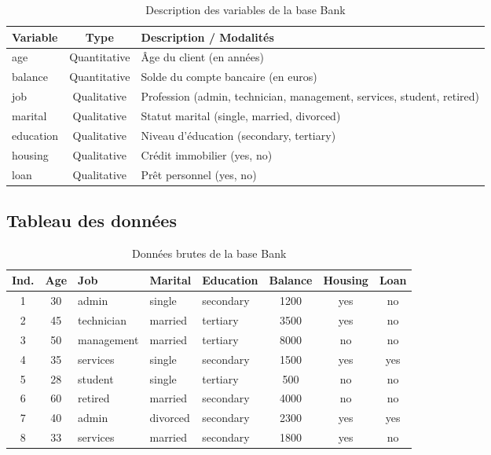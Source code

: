\documentclass[12pt,a4paper]{article}
\begin{document}
\begin{table}[H]
\centering
\caption{Description des variables de la base Bank}
\begin{tabular}{|l|c|l|}
\hline
\textbf{Variable} & \textbf{Type} & \textbf{Description / Modalités} \\
\hline
age & Quantitative & Âge du client (en années) \\
balance & Quantitative & Solde du compte bancaire (en euros) \\
job & Qualitative & Profession (admin, technician, management, services, student, retired) \\
marital & Qualitative & Statut marital (single, married, divorced) \\
education & Qualitative & Niveau d'éducation (secondary, tertiary) \\
housing & Qualitative & Crédit immobilier (yes, no) \\
loan & Qualitative & Prêt personnel (yes, no) \\
\hline
\end{tabular}
\end{table}

\subsection{Tableau des données}

\begin{table}[H]
\centering
\caption{Données brutes de la base Bank}
\footnotesize
\begin{tabular}{|c|c|l|l|l|c|c|c|}
\hline
\textbf{Ind.} & \textbf{Age} & \textbf{Job} & \textbf{Marital} & \textbf{Education} & \textbf{Balance} & \textbf{Housing} & \textbf{Loan} \\
\hline
1 & 30 & admin & single & secondary & 1200 & yes & no \\
2 & 45 & technician & married & tertiary & 3500 & yes & no \\
3 & 50 & management & married & tertiary & 8000 & no & no \\
4 & 35 & services & single & secondary & 1500 & yes & yes \\
5 & 28 & student & single & tertiary & 500 & no & no \\
6 & 60 & retired & married & secondary & 4000 & no & no \\
7 & 40 & admin & divorced & secondary & 2300 & yes & yes \\
8 & 33 & services & married & secondary & 1800 & yes & no \\
\hline
\end{tabular}
\end{table}
\end{document}
